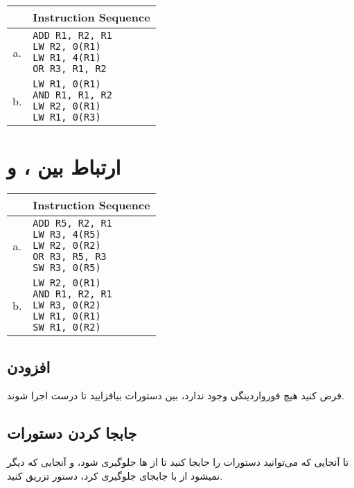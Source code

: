 \documentclass[11pt, dvipsnames, svgnames, x11names]{article}
\begin{document}
\begin{latin}
\begin{table}[H]
\begin{center}
\begin{tabular}{|c|l|}
\hline
& Instruction Sequence \\
\hline
a. &
\makecell[l]{
\texttt{ADD R1, R2, R1} \\ 
\texttt{LW R2, 0(R1)} \\ 
\texttt{LW R1, 4(R1)} \\
\texttt{OR R3, R1, R2}} \\ 
\hline
b. &
\makecell[l]{
\texttt{LW R1, 0(R1)} \\ 
\texttt{AND R1, R1, R2} \\ 
\texttt{LW R2, 0(R1)} \\
\texttt{LW R1, 0(R3)}}\\
\hline
\end{tabular}
\end{center}
\end{table}
\end{latin}

\section{ارتباط بین ،  و }

\begin{latin}
\begin{table}[H]
\begin{center}
\begin{tabular}{|c|l|}
\hline
& Instruction Sequence \\
\hline
a. &
\makecell[l]{
\texttt{ADD R5, R2, R1} \\ 
\texttt{LW R3, 4(R5)} \\ 
\texttt{LW R2, 0(R2)} \\
\texttt{OR R3, R5, R3} \\
\texttt{SW R3, 0(R5)}} \\ 
\hline
b. &
\makecell[l]{
\texttt{LW R2, 0(R1)} \\ 
\texttt{AND R1, R2, R1} \\ 
\texttt{LW R3, 0(R2)} \\
\texttt{LW R1, 0(R1)} \\ 
\texttt{SW R1, 0(R2)}}\\
\hline
\end{tabular}
\end{center}
\end{table}
\end{latin}

\subsection{افزودن }
فرض کنید هیچ فورواردینگی وجود ندارد، بین دستورات 
بیافزایید تا درست اجرا شوند.

\subsection{جابجا کردن دستورات}
تا آنجایی که می‌توانید دستورات را جابجا کنید تا از 
ها
جلوگیری شود، و آنجایی که دیگر نمیشود از 
با جابجای جلوگیری کرد، دستور
تزریق کنید.
\end{document}
